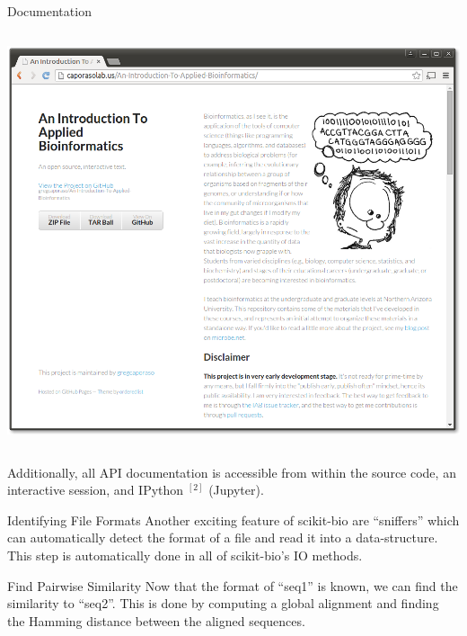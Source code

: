 \documentclass[final,t]{beamer}
\begin{document}
\begin{frame}{}
\begin{columns}[t]
\begin{column}{.3\linewidth}
\begin{block}{Documentation}
\begin{columns}
\begin{column}{.45\linewidth}
\begin{minipage}[c][15cm][c]{\linewidth}
                        \includegraphics[width=1\linewidth]{assets/iab}\\
                    \end{minipage}
                \end{column}
            \end{columns}
            Additionally, all API documentation is accessible from within the source code, an interactive session, and IPython $^{[2]}$ (Jupyter).

        \end{block}

        \begin{block}{Identifying File Formats}
            Another exciting feature of scikit-bio are ``sniffers'' which can automatically detect the format of a file and read it into a data-structure. \newline\newline
             \vspace{1cm}
            This step is automatically done in all of scikit-bio's IO methods.
        \end{block}

        \begin{block}{Find Pairwise Similarity}
          Now that the format of ``seq1'' is known, we can find the similarity to ``seq2''. This is done by computing a global alignment and finding the Hamming distance between the aligned sequences.
          \newline\newline
           \vspace{1cm}
        \end{block}




\end{column}
\end{columns}
\end{frame}
\end{document}
